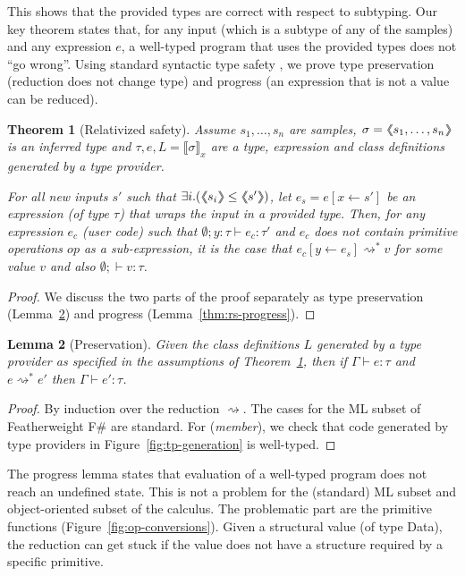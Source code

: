 \documentclass[10pt,preprint,blind,clearpagebib]{sigplanconf}
\newcommand{\langl}{\begin{picture}(4.5,7)
\put(1.1,2.5){\rotatebox{60}{\line(1,0){5.5}}}
\put(1.1,2.5){\rotatebox{300}{\line(1,0){5.5}}}
\end{picture}}
\newcommand{\rangl}{\begin{picture}(4.5,7)
\put(.9,2.5){\rotatebox{120}{\line(1,0){5.5}}}
\put(.9,2.5){\rotatebox{240}{\line(1,0){5.5}}}
\end{picture}}
\newcommand{\llangl}{\langl\hspace{-0.35em}\langl}
\newcommand{\rrangl}{\rangl\hspace{-0.35em}\rangl}
\newcommand{\ident}[1]{\textnormal{\sffamily #1}}
\newcommand{\reduce}{\rightsquigarrow}
\newcommand{\sem}[1]{\llbracket #1 \rrbracket}
\newcommand{\semalt}[1]{\llangl #1 \rrangl}
\newtheorem{theorem}{Theorem}
\newtheorem{lemma}[theorem]{Lemma}
\begin{document}
\noindent
This shows that the provided types are correct with respect to subtyping. Our key
theorem states that, for any input (which is a subtype of any of the samples) and 
any expression $e$, a well-typed program that uses the provided types does not ``go wrong''.
Using standard syntactic type safety  \cite{syntactic}, we prove type preservation 
(reduction does not change type) and progress (an expression that is not a value can be reduced).

\begin{theorem}[Relativized safety]
\label{thm:safety}
Assume $s_1, \ldots, s_n$ are samples, $\sigma=\semalt{s_1, \ldots, s_n}$ is an inferred
type and $\tau,e,L = \sem{\sigma}_x$ are a type, expression and class definitions generated by a 
type provider.

For all new inputs $s'$ such that $\exists i.(\semalt{s_i} \leq \semalt{s'})$, let $e_s=e[x\leftarrow s']$
be an expression (of type $\tau$) that wraps the input in a provided type. Then, for any expression $e_c$
(user code) such that $\emptyset; y:\tau \vdash e_c:\tau'$ and $e_c$ does not contain primitive operations
$op$ as a sub-expression, it is the case that $e_c[y\leftarrow e_s] \reduce^{*} v$ for some value $v$ and
also $\emptyset; \vdash v : \tau$.
\end{theorem}
\begin{proof}
We discuss the two parts of the proof separately as type preservation (Lemma~\ref{thm:rs-preservation})
and progress (Lemma~\ref{thm:rs-progress}).
\end{proof}

\begin{lemma}[Preservation]
\label{thm:rs-preservation}
Given the class definitions $L$ generated by a type provider as specified in
the assumptions of Theorem~\ref{thm:safety}, then if $\Gamma \vdash e : \tau$ and 
$e \reduce^{*} e'$ then $\Gamma \vdash e' : \tau$.
\end{lemma}
\begin{proof}
By induction over the reduction $\reduce$. The cases for the ML subset of Featherweight F\# 
are standard. For (\emph{member}), we check that code generated by type providers
in Figure~\ref{fig:tp-generation} is well-typed.
\end{proof}

\noindent
The progress lemma states that evaluation of a well-typed program does not reach an undefined state. 
This is not a problem for the (standard) ML subset and object-oriented subset of the calculus. The 
problematic part are the primitive functions (Figure~\ref{fig:op-conversions}). Given a structural 
value (of type \ident{Data}), the reduction can get stuck if the value does not have a structure 
required by a specific primitive.
\end{document}
